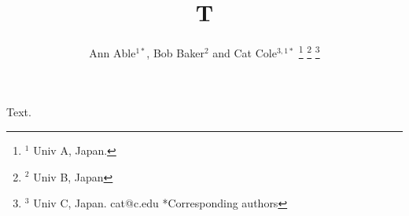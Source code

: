 \documentclass{article}
\begin{document}
\title{T}
\author{Ann Able$^{1*}$, Bob Baker$^{2}$ and Cat Cole$^{3,1*}$
\thanks{$^{1}$ Univ A, Japan.}
\thanks{$^{2}$ Univ B, Japan}
\thanks{$^{3}$ Univ C, Japan. cat@c.edu *Corresponding authors}}
\maketitle
Text.
\end{document}
